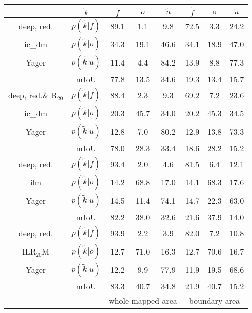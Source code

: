 \begin{center}
		\begin{tabular}{c|c|ccc|ccc}
			& $\tilde{k}$ & $\tilde{f}$ & $\tilde{o}$ & $\tilde{u}$ & $\tilde{f}$ & $\tilde{o}$ & $\tilde{u}$\\
			\hline
			deep, red.&$p(\tilde{k}|f)$ & \textcolor{mygreen}{89.1} & \textcolor{myred}{1.1} & 9.8& \textcolor{mygreen}{72.5} & \textcolor{myred}{3.3} & 24.2 \\
			\gls{ic_dm}&$p(\tilde{k}|o)$ & \textcolor{myred}{34.3} & \textcolor{mygreen}{19.1} & 46.6& \textcolor{myred}{34.1} & \textcolor{mygreen}{18.9} & 47.0 \\
			Yager&$p(\tilde{k}|u)$ & 11.4 & 4.4 & 84.2& 13.9 & 8.8 & 77.3 \\
			& mIoU &77.8&13.5&34.6&19.3&13.4&15.7 \\
			\hline
			deep, red.\& R$_{20}$ &$p(\tilde{k}|f)$ & \textcolor{mygreen}{88.4} & \textcolor{myred}{2.3} & 9.3& \textcolor{mygreen}{69.2} & \textcolor{myred}{7.2} & 23.6 \\
			\gls{ic_dm}&$p(\tilde{k}|o)$ & \textcolor{myred}{20.3} & \textcolor{mygreen}{45.7} & 34.0& \textcolor{myred}{20.2} & \textcolor{mygreen}{45.3} & 34.5 \\
			Yager&$p(\tilde{k}|u)$ & 12.8 & 7.0 & 80.2& 12.9 & 13.8 & 73.3 \\
			& mIoU &78.0&28.3&33.4&18.6&28.2&15.2 \\
			\hline
			deep, red.&$p(\tilde{k}|f)$ & \textcolor{mygreen}{93.4} & \textcolor{myred}{2.0} & 4.6& \textcolor{mygreen}{81.5} & \textcolor{myred}{6.4} & 12.1 \\
			\gls{ilm}&$p(\tilde{k}|o)$ & \textcolor{myred}{14.2} & \textcolor{mygreen}{68.8} & 17.0& \textcolor{myred}{14.1} & \textcolor{mygreen}{68.3} & 17.6 \\
			Yager&$p(\tilde{k}|u)$ & 14.5 & 11.4 & 74.1& 14.7 & 22.3 & 63.0 \\
			& mIoU &82.2&38.0&32.6&21.6&37.9&14.0 \\
			\hline
			deep, red.&$p(\tilde{k}|f)$ & \textcolor{mygreen}{93.9} & \textcolor{myred}{2.2} & 3.9& \textcolor{mygreen}{82.0} & \textcolor{myred}{7.2} & 10.8 \\
			ILR$_{20}$M&$p(\tilde{k}|o)$ & \textcolor{myred}{12.7} & \textcolor{mygreen}{71.0} & 16.3& \textcolor{myred}{12.7} & \textcolor{mygreen}{70.6} & 16.7 \\
			Yager&$p(\tilde{k}|u)$ & 12.2 & 9.9 & 77.9& 11.9 & 19.5 & 68.6 \\
			& mIoU &83.3&40.7&34.8&21.9&40.7&15.2 \\
			\hline
			& & \multicolumn{3}{c|}{whole mapped area} & \multicolumn{3}{c}{boundary area}
	\end{tabular}
\end{center}
